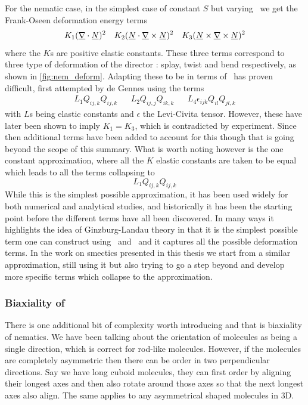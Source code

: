 \documentclass[12pt]{article}
\newcommand{\suf}[2]{\stackunder[0.5pt]{\stackunder[1pt]{\ensuremath{#1}}{\rule{\widthof{\ensuremath{#2}}*\real{0.9}}{.1ex}}}{}}
\newcommand{\duf}[2]{\stackunder[0.5pt]{\stackunder[0.8pt]{\stackunder[1pt]{\ensuremath{#1}}{\rule{\widthof{\ensuremath{#2}}*\real{0.9}}{.1ex}}}{\rule{\widthof{\ensuremath{#2}}*\real{0.9}}{.1ex}}}{}}
\newcommand{\su}[1]{\suf{#1}{#1}}
\newcommand{\du}[1]{\duf{#1}{#1}}
\newcommand{\mgrad}{\suf{\nabla}{K}}
\newcommand{\QQ}{\du{Q}}
\newcommand{\NN}{\su{N}}
\begin{document}
For the nematic case, in the simplest case of constant $S$ but varying \NN\ we get the Frank-Oseen deformation energy terms\cite{brayTheoryPhaseOrdering1993,frankLiquidCrystalsTheory1958,gennesPhysicsLiquidCrystals1995}
\begin{align}
    K_1 (\mgrad \cdot \su{N})^2 && K_2 (\su{N} \cdot \mgrad \times \su{N})^2 && K_3 (\su{N} \times \mgrad \times \su{N})^2
\end{align}
where the $K$s are positive elastic constants.
These three terms correspond to three type of deformation of the director \NN: splay, twist and bend respectively, as shown in \cref{fig:nem_deform}.
Adapting these to be in terms of \QQ\ has proven difficult, first attempted by de Gennes\cite{gennesPhysicsLiquidCrystals1995} using the terms
\begin{align}
    L_1Q_{ij,k}Q_{ij,k} && L_2Q_{ij,j}Q_{ik,k} && L_4\epsilon_{ijk}Q_{il}Q_{jl,k}
\end{align}
with $L$s being elastic constants and $\epsilon$ the Levi-Civita tensor.
However, these have later been shown to imply $K_1 = K_3$\cite{lubenskyMolecularDescriptionNematic1970}, which is contradicted by experiment.
Since then additional terms have been added to account for this\cite{longaExtensionLandauGinzburgdeGennes1987} though that is going beyond the scope of this summary.
What is worth noting however is the one constant approximation, where all the $K$ elastic constants are taken to be equal which leads to all the terms collapsing to
\begin{equation}
    L_1 Q_{ij,k}Q_{ij,k}
\end{equation}
While this is the simplest possible approximation, it has been used widely for both numerical and analytical studies, and historically it has been the starting point before the different terms have all been discovered.
In many ways it highlights the idea of Ginzburg-Landau theory in that it is the simplest possible term one can construct using \QQ\ and \mgrad\ and it captures all the possible deformation terms.
In the work on smectics presented in this thesis we start from a similar approximation, still using it but also trying to go a step beyond and develop more specific terms which collapse to the approximation.


\subsubsection{Biaxiality of \QQ}
There is one additional bit of complexity worth introducing and that is biaxiality of nematics.
We have been talking about the orientation of molecules as being a single direction, which is correct for rod-like molecules.
However, if the molecules are completely asymmetric then there can be order in two perpendicular directions.
Say we have long cuboid molecules, they can first order by aligning their longest axes and then also rotate around those axes so that the next longest axes also align.
The same applies to any asymmetrical shaped molecules in 3D.
\end{document}
